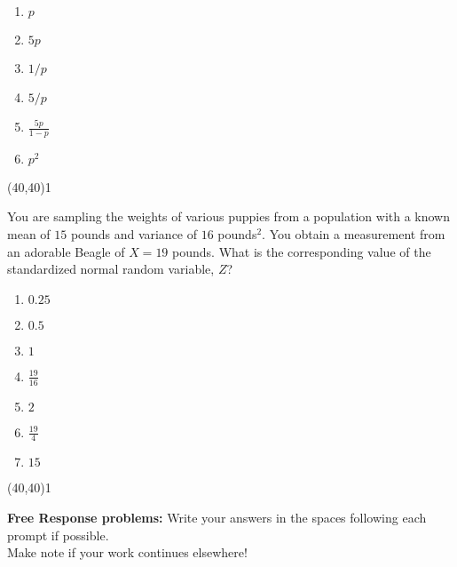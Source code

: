 \documentclass[addpoints]{exam}
\def\solutions{0}
\begin{document}
{\begin{questions}
\begin{minipage}[b]{.85\textwidth}
	\begin{enumerate}[label=\Alph*.]
		\item $p$
		\item $5p$
		\item $1/p$
		\item $5/p$
		\item $\frac{5p}{1-p}$
		\item $p^2$
	\end{enumerate}
\end{minipage}
\begin{minipage}[b]{.1\textwidth}
	\vspace{\fill}\framebox(40,40){\if\solutions1 \fi}
\end{minipage}
\clearpage


\question[3] You are sampling the weights of various puppies from a population with a known mean of $15$ pounds and variance of $16$ pounds$^2$. You obtain a measurement from an adorable Beagle of $X = 19$ pounds. What is the corresponding value of the standardized normal random variable, $Z$?

\begin{minipage}[b]{.85\textwidth}
	\begin{enumerate}[label=\Alph*.]
		\item $0.25$
		\item $0.5$
		\item $1$
		\item $\frac{19}{16}$
		\item $2$
		\item $\frac{19}{4}$
		\item $15$
	\end{enumerate}
\end{minipage}
\begin{minipage}[b]{.1\textwidth}
	\vspace{\fill}\framebox(40,40){\if\solutions1 \fi}
\end{minipage}

{\begin{center} {\bf Free Response problems:} Write your answers in the spaces following each prompt if possible.\\  Make note if your work continues elsewhere!\end{center}}\vspace{2mm}


\end{questions}}
\end{document}
